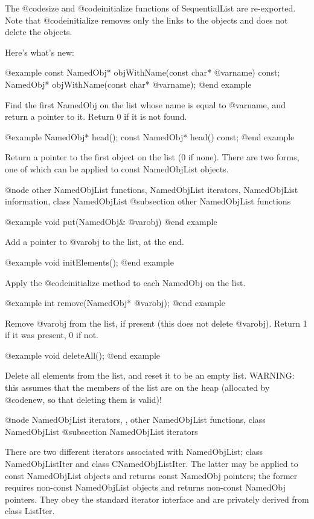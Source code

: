 The @code{size} and @code{initialize} functions of SequentialList
are re-exported.  Note that @code{initialize} removes only the links
to the objects and does not delete the objects.

Here's what's new:

@example
const NamedObj* objWithName(const char* @var{name}) const;
NamedObj* objWithName(const char* @var{name});
@end example

Find the first NamedObj on the list whose name is equal to @var{name},
and return a pointer to it.  Return 0 if it is not found.

@example
NamedObj* head();
const NamedObj* head() const;
@end example

Return a pointer to the first object on the list (0 if none).  There
are two forms, one of which can be applied to const NamedObjList objects.

@node other NamedObjList functions, NamedObjList iterators, NamedObjList information, class NamedObjList
@subsection other NamedObjList functions

@example
void put(NamedObj& @var{obj})
@end example

Add a pointer to @var{obj} to the list, at the end.

@example
void initElements();
@end example

Apply the @code{initialize} method to each NamedObj on the list.

@example
int remove(NamedObj* @var{obj});
@end example

Remove @var{obj} from the list, if present (this does not delete
@var{obj}).  Return 1 if it was present, 0 if not.

@example
void deleteAll();
@end example

Delete all elements from the list, and reset it to be an empty list.
WARNING: this assumes that the members of the list are on the heap
(allocated by @code{new}, so that deleting them is valid)!

@node NamedObjList iterators,  , other NamedObjList functions, class NamedObjList
@subsection NamedObjList iterators

There are two different iterators associated with NamedObjList;
class NamedObjListIter and class CNamedObjListIter.  The latter may
be applied to const NamedObjList objects and returns const NamedObj
pointers; the former requires non-const NamedObjList objects and
returns non-const NamedObj pointers.  They obey the standard iterator
interface and are privately derived from class ListIter.

